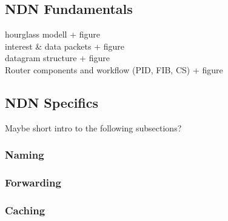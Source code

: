 \subsection{NDN Fundamentals}
hourglass modell + figure \\
interest \& data packets + figure \\
datagram structure + figure \\
Router components and workflow (PID, FIB, CS) + figure \\

\subsection{NDN Specifics}
Maybe short intro to the following subsections?

\subsubsection{Naming}

\subsubsection{Forwarding}

\subsubsection{Caching}

